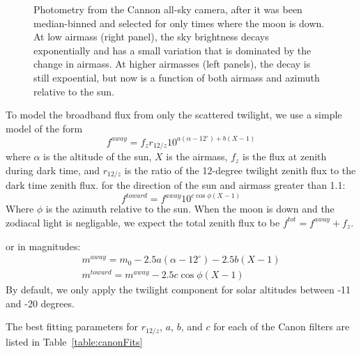 \documentclass{emulateapj}  %
\begin{document}
\begin{figure*}
  \caption{Photometry from the Cannon all-sky camera, after it was been median-binned and selected for only times where the moon is down.  At low airmass (right panel), the sky brightness decays exponentially and has a small variation that is dominated by the change in airmass.  At higher airmasses (left panels), the decay is still expoential, but now is a function of both airmass and azimuth relative to the sun.}
\end{figure*}

To model the broadband flux from only the scattered twilight, we use a simple model of the form
\begin{equation}\label{eqn:twi1}
  f^{away} = f_{z} r_{12/z} 10^{a(\alpha-12^{\circ})+b(X-1)}
\end{equation}
where $\alpha$ is the altitude of the sun, $X$ is the airmass, $f_{z}$ is the flux at zenith during dark time, and $r_{12/z}$ is the ratio of the 12-degree twilight zenith flux to the dark time zenith flux.
for the direction of the sun and airmass greater than 1.1:
\begin{equation}\label{eqn:twi2}
  f^{toward} = f^{away}10^{c \cos{\phi}(X-1)}
\end{equation}
Where $\phi$ is the azimuth relative to the sun. When the moon is down and the zodiacal light is negligable, we expect the total zenith flux to be $f^{tot} = f^{away} + f_{z}$.  

or in magnitudes:
\begin{eqnarray}
  m^{away} = m_0 -2.5a(\alpha-12^{\circ})-2.5b(X-1) \\
  m^{toward} = m^{away} -2.5c\cos{\phi}(X-1)
\end{eqnarray}
By default, we only apply the twilight component for solar altitudes between -11 and -20 degrees.


The best fitting parameters for $r_{12/z}$, $a$, $b$, and $c$ for each of the Canon filters are listed in Table~\ref{table:canonFits}
\end{document}
